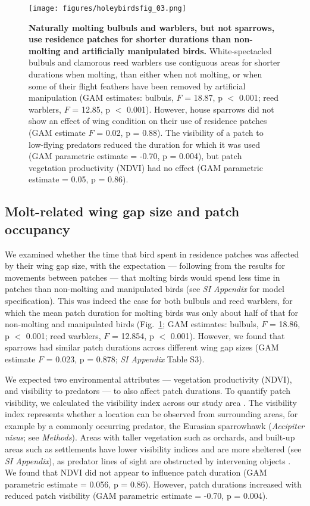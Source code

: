 \begin{refsection}
\begin{figure}%
    \centering
    \texttt{[image: figures/holeybirdsfig\_03.png]}
    \caption{
        \textbf{Naturally molting bulbuls and warblers, but not sparrows, use residence patches for shorter durations than non-molting and artificially manipulated birds.}
        White-spectacled bulbuls and clamorous reed warblers use contiguous areas for shorter durations when molting, than either when not molting, or when some of their flight feathers have been removed by artificial manipulation (GAM estimates: bulbuls, $F$ = 18.87, p $<$ 0.001; reed warblers, $F$ = 12.85, p $<$ 0.001).
        However, house sparrows did not show an effect of wing condition on their use of residence patches (GAM estimate $F$ = 0.02, p = 0.88).
        The visibility of a patch to low-flying predators reduced the duration for which it was used (GAM parametric estimate = -0.70, p = 0.004), but patch vegetation productivity (NDVI) had no effect (GAM parametric estimate = 0.05, p = 0.86).
    }\label{fig_holey_03}
\end{figure}

\subsection*{Molt-related wing gap size and patch occupancy}

We examined whether the time that bird spent in residence patches was affected by their wing gap size, with the expectation --- following from the results for movements between patches --- that molting birds would spend less time in patches than non-molting and manipulated birds (see \textit{SI Appendix} for model specification).
This was indeed the case for both bulbuls and reed warblers, for which the mean patch duration for molting birds was only about half of that for non-molting and manipulated birds (Fig.~\ref{fig_holey_03}; GAM estimates: bulbuls, $F$ = 18.86, p $<$ 0.001; reed warblers, $F$ = 12.854, p $<$ 0.001).
However, we found that sparrows had similar patch durations across different wing gap sizes (GAM estimate $F$ = 0.023, p = 0.878; \textit{SI Appendix} Table S3).

We expected two environmental attributes --- vegetation productivity (NDVI), and visibility to predators --- to also affect patch durations.
To quantify patch visibility, we calculated the visibility index across our study area \cite{olsoy2015,aben2018,aben2021}.
The visibility index represents whether a location can be observed from surrounding areas, for example by a commonly occurring predator, the Eurasian sparrowhawk (\textit{Accipiter nisus}; see \textit{Methods}).
Areas with taller vegetation such as orchards, and built-up areas such as settlements have lower visibility indices and are more sheltered (see \textit{SI Appendix}), as predator lines of sight are obstructed by intervening objects \cite{olsoy2015}.
We found that NDVI did not appear to influence patch duration (GAM parametric estimate = 0.056, p = 0.86).
However, patch durations increased with reduced patch visibility (GAM parametric estimate = -0.70, p = 0.004).


\end{refsection}
